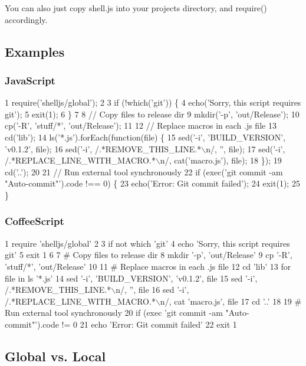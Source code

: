 You can also just copy {\ttfamily shell.\+js} into your project\textquotesingle{}s directory, and {\ttfamily require()} accordingly.

\subsection*{Examples}

\subsubsection*{Java\+Script}


\begin{DoxyCode}
1 require('shelljs/global');
2 
3 if (!which('git')) \{
4   echo('Sorry, this script requires git');
5   exit(1);
6 \}
7 
8 // Copy files to release dir
9 mkdir('-p', 'out/Release');
10 cp('-R', 'stuff/*', 'out/Release');
11 
12 // Replace macros in each .js file
13 cd('lib');
14 ls('*.js').forEach(function(file) \{
15   sed('-i', 'BUILD\_VERSION', 'v0.1.2', file);
16   sed('-i', /.*REMOVE\_THIS\_LINE.*\(\backslash\)n/, '', file);
17   sed('-i', /.*REPLACE\_LINE\_WITH\_MACRO.*\(\backslash\)n/, cat('macro.js'), file);
18 \});
19 cd('..');
20 
21 // Run external tool synchronously
22 if (exec('git commit -am "Auto-commit"').code !== 0) \{
23   echo('Error: Git commit failed');
24   exit(1);
25 \}
\end{DoxyCode}


\subsubsection*{Coffee\+Script}


\begin{DoxyCode}
1 require 'shelljs/global'
2 
3 if not which 'git'
4   echo 'Sorry, this script requires git'
5   exit 1
6 
7 # Copy files to release dir
8 mkdir '-p', 'out/Release'
9 cp '-R', 'stuff/*', 'out/Release'
10 
11 # Replace macros in each .js file
12 cd 'lib'
13 for file in ls '*.js'
14   sed '-i', 'BUILD\_VERSION', 'v0.1.2', file
15   sed '-i', /.*REMOVE\_THIS\_LINE.*\(\backslash\)n/, '', file
16   sed '-i', /.*REPLACE\_LINE\_WITH\_MACRO.*\(\backslash\)n/, cat 'macro.js', file
17 cd '..'
18 
19 # Run external tool synchronously
20 if (exec 'git commit -am "Auto-commit"').code != 0
21   echo 'Error: Git commit failed'
22   exit 1
\end{DoxyCode}


\subsection*{Global vs. Local}

